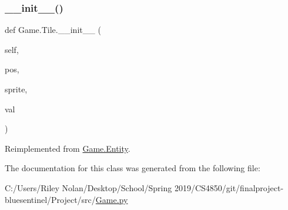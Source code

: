 \subsubsection{\texorpdfstring{\_\_init\_\_()}{\_\_init\_\_()}}
{\footnotesize\ttfamily def Game.\+Tile.\+\_\+\+\_\+init\+\_\+\+\_\+ (\begin{DoxyParamCaption}\item[{}]{self,  }\item[{}]{pos,  }\item[{}]{sprite,  }\item[{}]{val }\end{DoxyParamCaption})}



Reimplemented from \mbox{\hyperlink{class_game_1_1_entity_a1cbc73a05ee02271fa7dca66f3a83ecf}{Game.\+Entity}}.



The documentation for this class was generated from the following file\+:\begin{DoxyCompactItemize}
\item 
C\+:/\+Users/\+Riley Nolan/\+Desktop/\+School/\+Spring 2019/\+C\+S4850/git/finalproject-\/bluesentinel/\+Project/src/\mbox{\hyperlink{_game_8py}{Game.\+py}}\end{DoxyCompactItemize}
